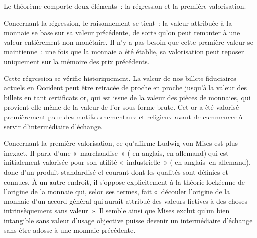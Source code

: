 Le théorème comporte deux éléments~: la régression et la première valorisation.


Concernant la régression, le raisonnement se tient~: la valeur attribuée à la monnaie se base sur sa valeur précédente, de sorte qu'on peut remonter à une valeur entièrement non monétaire. Il n'y a pas besoin que cette première valeur se maintienne~: une fois que la monnaie a été établie, sa valorisation peut reposer uniquement sur la mémoire des prix précédents. 

Cette régression se vérifie historiquement. La valeur de nos billets fiduciaires actuels en Occident peut être retracée de proche en proche jusqu'à la valeur des billets en tant certificats or, qui est issue de la valeur des pièces de monnaies, qui provient elle-même de la valeur de l'or sous forme brute. Cet or a été valorisé premièrement pour des motifs ornementaux et religieux avant de commencer à servir d'intermédiaire d'échange.


Concernant la première valorisation, ce qu'affirme Ludwig von Mises est plus inexact. Il parle d'une «~marchandise~» ( en anglais,  en allemand) qui est initialement valorisée pour son utilité «~industrielle~» ( en anglais,  en allemand), donc d'un produit standardisé et courant dont les qualités sont définies et connues. À un autre endroit, il s'oppose explicitement à la théorie lockéenne de l'origine de la monnaie qui, selon ses termes, fait «~découler l'origine de la monnaie d'un accord général qui aurait attribué des valeurs fictives à des choses intrinsèquement sans valeur~». Il semble ainsi que Mises exclut qu'un bien intangible sans valeur d'usage objective puisse devenir un intermédiaire d'échange sans être adossé à une monnaie précédente. %

